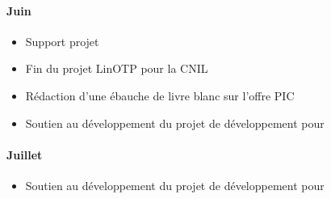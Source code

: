 \paragraph{Juin}
\begin{itemize}
	\item Support projet
	\item Fin du projet LinOTP pour la CNIL
	\item Rédaction d'une ébauche de livre blanc sur l'offre PIC
	\item Soutien au développement du projet de développement pour \abt{}
\end{itemize}

\paragraph{Juillet}
\begin{itemize}
	\item Soutien au développement du projet de développement pour \abt{}
\end{itemize}

